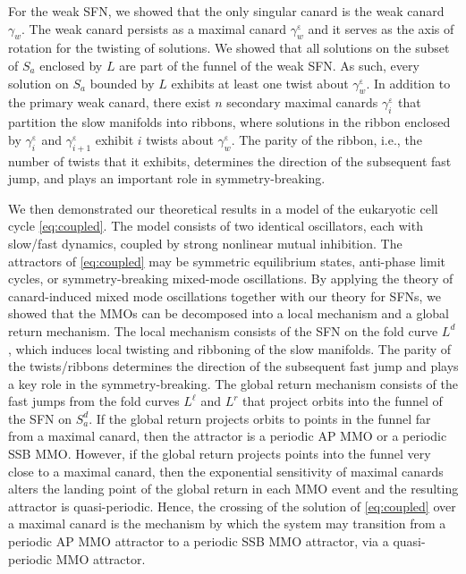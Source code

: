 \documentclass[10pt,onecolumn]{article}
\theoremstyle{plain}
\DeclareMathOperator{\eps}{\varepsilon}
\begin{document}
For the weak SFN, we showed that the only singular canard is the weak canard $\gamma_w$.
The weak canard persists as a maximal canard $\gamma_w^{\eps}$ and it serves as the axis of rotation for the twisting of solutions.  
We showed that all solutions on the subset of $S_a$ enclosed by $L$ are part of the funnel of the weak SFN. 
As such, every solution on $S_a$ bounded by $L$ exhibits at least one twist about $\gamma_w^{\eps}$.
In addition to the primary weak canard, there exist $n$ secondary maximal canards $\gamma_i^{\eps}$ that partition the slow manifolds into ribbons, where solutions in the ribbon enclosed by $\gamma_{i}^{\eps}$ and $\gamma_{i+1}^{\eps}$ exhibit $i$ twists about $\gamma_w^{\eps}$. 
The parity of the ribbon, i.e., the number of twists that it exhibits, determines the direction of the subsequent fast jump, and plays an important role in symmetry-breaking.

We then demonstrated our theoretical results in a model of the eukaryotic cell cycle \eqref{eq:coupled}. The model consists of two identical oscillators, each with slow/fast dynamics, coupled by strong nonlinear mutual inhibition. 
The attractors of \eqref{eq:coupled} may be symmetric equilibrium states, anti-phase limit cycles, or symmetry-breaking mixed-mode oscillations. 
By applying the theory of canard-induced mixed mode oscillations together with our theory for SFNs, we showed that the MMOs can be decomposed into a local mechanism and a global return mechanism. 
The local mechanism consists of the SFN on the fold curve $L^d$, which induces local twisting and ribboning of the slow manifolds. 
The parity of the twists/ribbons determines the direction of the subsequent fast jump and plays a key role in the symmetry-breaking. 
The global return mechanism consists of the fast jumps from the fold curves $L^{\ell}$ and $L^r$ that project orbits into the funnel of the SFN on $S_a^d$.
If the global return projects orbits to points in the funnel far from a maximal canard, then the attractor is a periodic AP MMO or a periodic SSB MMO. 
However, if the global return projects points into the funnel very close to a maximal canard, then the exponential sensitivity of maximal canards alters the landing point of the global return in each MMO event and the resulting attractor is quasi-periodic. 
Hence, the crossing of the solution of \eqref{eq:coupled} over a maximal canard is the mechanism by which the system may transition from a periodic AP MMO attractor to a periodic SSB MMO attractor, via a quasi-periodic MMO attractor. 
\end{document}
